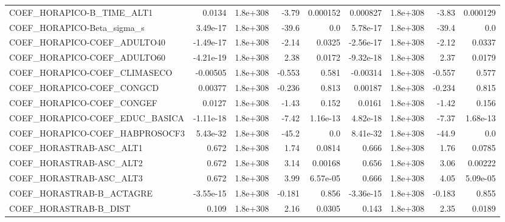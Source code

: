 \begin{tabular}{lrrrrrrrr}
COEF\_HORAPICO-B\_TIME\_ALT1         &      0.0134 &     1.8e+308 &     -3.79 & 0.000152 &   0.000827 &    1.8e+308 &        -3.83 &      0.000129 \\
COEF\_HORAPICO-Beta\_sigma\_s        &    3.49e-17 &     1.8e+308 &     -39.6 &      0.0 &   5.78e-17 &    1.8e+308 &        -39.4 &           0.0 \\
COEF\_HORAPICO-COEF\_ADULTO40       &   -1.49e-17 &     1.8e+308 &     -2.14 &   0.0325 &  -2.56e-17 &    1.8e+308 &        -2.12 &        0.0337 \\
COEF\_HORAPICO-COEF\_ADULTO60       &   -4.21e-19 &     1.8e+308 &      2.38 &   0.0172 &  -9.32e-18 &    1.8e+308 &         2.37 &        0.0179 \\
COEF\_HORAPICO-COEF\_CLIMASECO      &    -0.00505 &     1.8e+308 &    -0.553 &    0.581 &   -0.00314 &    1.8e+308 &       -0.557 &         0.577 \\
COEF\_HORAPICO-COEF\_CONGCD         &     0.00377 &     1.8e+308 &    -0.236 &    0.813 &    0.00187 &    1.8e+308 &       -0.234 &         0.815 \\
COEF\_HORAPICO-COEF\_CONGEF         &      0.0127 &     1.8e+308 &     -1.43 &    0.152 &     0.0161 &    1.8e+308 &        -1.42 &         0.156 \\
COEF\_HORAPICO-COEF\_EDUC\_BASICA    &   -1.11e-18 &     1.8e+308 &     -7.42 & 1.16e-13 &   4.82e-18 &    1.8e+308 &        -7.37 &      1.68e-13 \\
COEF\_HORAPICO-COEF\_HABPROSOCF3    &    5.43e-32 &     1.8e+308 &     -45.2 &      0.0 &   8.41e-32 &    1.8e+308 &        -44.9 &           0.0 \\
COEF\_HORASTRAB-ASC\_ALT1           &       0.672 &     1.8e+308 &      1.74 &   0.0814 &      0.666 &    1.8e+308 &         1.76 &        0.0785 \\
COEF\_HORASTRAB-ASC\_ALT2           &       0.672 &     1.8e+308 &      3.14 &  0.00168 &      0.656 &    1.8e+308 &         3.06 &       0.00222 \\
COEF\_HORASTRAB-ASC\_ALT3           &       0.672 &     1.8e+308 &      3.99 & 6.57e-05 &      0.666 &    1.8e+308 &         4.05 &      5.09e-05 \\
COEF\_HORASTRAB-B\_ACTAGRE          &   -3.55e-15 &     1.8e+308 &    -0.181 &    0.856 &  -3.36e-15 &    1.8e+308 &       -0.183 &         0.855 \\
COEF\_HORASTRAB-B\_DIST             &       0.109 &     1.8e+308 &      2.16 &   0.0305 &      0.143 &    1.8e+308 &         2.35 &        0.0189 \\

\end{tabular}
